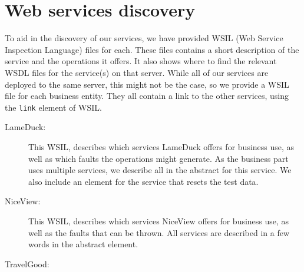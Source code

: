 \chapter{Web services discovery}

To aid in the discovery of our services, we have provided WSIL (Web Service Inspection Language) files for each. These files contains a short description of the service and the operations it offers. It also shows where to find the relevant WSDL files for the service(s) on that server. While all of our services are deployed to the same server, this might not be the case, so we provide a WSIL file for each business entity. They all contain a link to the other services, using the \texttt{link} element of WSIL.

\begin{description}
\item [LameDuck:] This WSIL, describes which services LameDuck offers for business use, as well as which faults the operations might generate. As the business part uses multiple services, we describe all in the abstract for this service. We also include an element for the service that resets the test data.

\item [NiceView:] This WSIL, describes which services NiceView offers for business use, as well as the faults that can be thrown. All services are described in a few words in the abstract element. 

\item [TravelGood:]  


\end{description}
